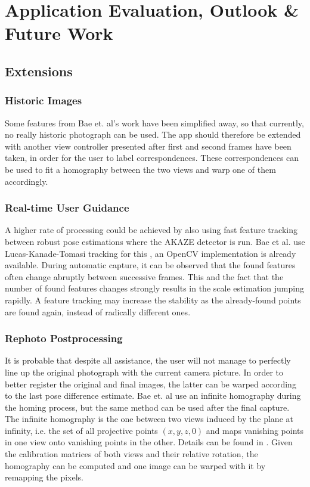 \chapter{Application Evaluation, Outlook \& Future Work}\label{ch:outlook}

\section{Extensions}

\subsection*{Historic Images}

Some features from Bae et. al's work have been simplified away, so that
currently, no really historic photograph can be used. The app should therefore
be extended with another view controller presented after first and second frames
have been taken, in order for the user to label correspondences. These
correspondences can be used to fit a homography between the two views and warp
one of them accordingly.

\subsection*{Real-time User Guidance}

A higher rate of processing could be achieved by also using fast feature
tracking between robust pose estimations where the AKAZE detector is run. Bae et
al. use Lucas-Kanade-Tomasi tracking for this \citep{lucas1981,tomasi1991}, an
OpenCV implementation is already available. During automatic capture, it can be
observed that the found features often change abruptly between successive
frames. This and the fact that the number of found features changes strongly
results in the scale estimation jumping rapidly. A feature tracking may increase
the stability as the already-found points are found again, instead of radically
different ones.

\subsection*{Rephoto Postprocessing}

It is probable that despite all assistance, the user will not manage to
perfectly line up the original photograph with the current camera picture.  In
order to better register the original and final images, the latter can be warped
according to the last pose difference estimate. Bae et. al use an infinite
homography during the homing process, but the same method can be used after the
final capture. The infinite homography is the one between two views induced by
the plane at infinity, i.e.  the set of all projective points $(x,y,z,0)$ and
maps vanishing points in one view onto vanishing points in the other. Details
can be found in \citep[ch. 13.4]{h&z2004}.  Given the calibration matrices of
both views and their relative rotation, the homography can be computed and one
image can be warped with it by remapping the pixels.

